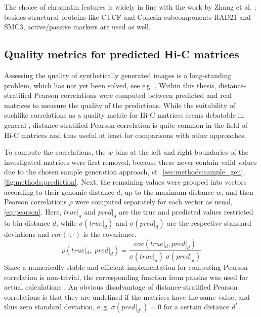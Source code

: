 The choice of chromatin features is widely in line with the work by Zhang et al. \cite{Zhang2019}; 
besides structural proteins like CTCF and Cohesin subcomponents RAD21 and SMC3, active/passive markers are used as well.

\subsection{Quality metrics for predicted Hi-C matrices} \label{sec:methods:metrics}
Assessing the quality of synthetically generated images is a long-standing problem, which has not yet been solved, see e\,g. \cite[p.\,19]{Wang2020}.
Within this thesis, distance-stratified Pearson correlations were computed between predicted and real matrices to measure the quality of the predictions.
While the suitability of suchlike correlations as a quality metric for Hi-C matrices seems debatable in general \cite{Yang2017}, 
distance stratified Pearson correlation is quite common in the field of Hi-C matrices and thus useful at least for comparisons with other approaches.

To compute the correlations, the $w$ bins at the left and right boundaries of the investigated matrices were first removed, because these never contain 
valid values due to the chosen sample generation approach, 
cf.~\cref{sec:methods:sample_gen}, \cref{fig:methods:prediction}.
Next, the remaining values were grouped into vectors according to their genomic distance $d$, up to the maximum distance $w$, 
and then Pearson correlations $\rho$ were computed separately for each vector as usual, \cref{eq:pearson}.
Here, $\mathit{true}|_d$ and $\mathit{pred}|_d$ are the true and predicted values restricted to bin distance $d$, while
$\sigma(\mathit{true}|_d)$ and $\sigma(\mathit{pred}|_d)$ are the respective standard deviations and $cov(\cdot,\cdot)$ is the covariance.
\begin{equation}
 \rho(\mathit{true}|_d, \; \mathit{pred}|_d) = \frac{cov(\mathit{true}|_d, \mathit{pred}|_d)}{\sigma(\mathit{true}|_d)\; \sigma(\mathit{pred}|_d)} \label{eq:pearson}
\end{equation}
Since a numerically stable and efficient implementation for computing Pearson correlation is non-trivial, the corresponding function from pandas was used
for actual calculations \cite{pandasPearson}.
An obvious disadvantage of distance-stratified Pearson correlations is that they are undefined if the matrices have the same value, 
and thus zero standard deviation, e.\,g. $\sigma(\mathit{pred}|_{d^*})=0$ for a certain distance $d^*$.

